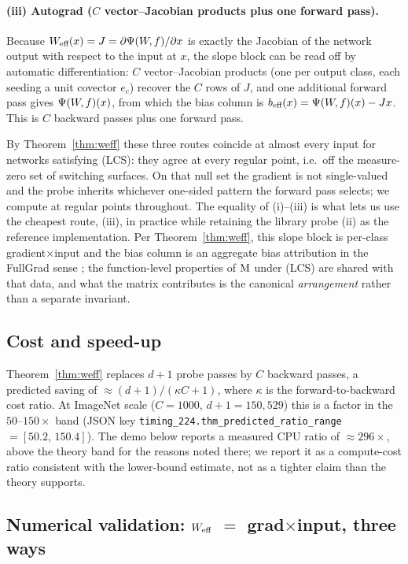 \paragraph{(iii) Autograd ($C$ vector--Jacobian products plus one forward pass).}
Because $W_{\text{eff}}(x)=J=\partial\Psi(W\!,f)/\partial x$ is exactly the Jacobian of the
network output with respect to the input at $x$, the slope block can be read off
by automatic differentiation: $C$ vector--Jacobian products (one per output
class, each seeding a unit covector $e_c$) recover the $C$ rows of $J$, and one
additional forward pass gives $\Psi(W\!,f)(x)$, from which the bias column is
$b_{\text{eff}}(x)=\Psi(W\!,f)(x)-Jx$. This is $C$ backward passes plus one forward pass.

By Theorem~\ref{thm:weff} these three routes coincide at almost every input for
networks satisfying (LCS): they agree at every regular point, i.e.\ off the measure-zero set
of switching surfaces. On that null set the gradient is not single-valued and
the probe inherits whichever one-sided pattern the forward pass selects; we
compute at regular points throughout. The equality of (i)--(iii) is what lets us
use the cheapest route, (iii), in practice while retaining the library probe
(ii) as the reference implementation. Per Theorem~\ref{thm:weff}, this slope
block is per-class gradient$\times$input and the bias column is an aggregate bias
attribution in the FullGrad sense
\citep{shrikumar2016not,ancona2018towards,srinivas2019full}; the function-level
properties of $\mathrm{M}$ under (LCS) are shared with that data, and what the matrix
contributes is the canonical \emph{arrangement} rather than a separate
invariant.

\subsection{Cost and speed-up}
\label{app:eng-cost}

Theorem~\ref{thm:weff} replaces $d{+}1$ probe passes by $C$ backward passes,
a predicted saving of $\approx(d{+}1)/(\kappa C+1)$, where $\kappa$ is the
forward-to-backward cost ratio. At ImageNet scale ($C=1000$,
$d{+}1=150{,}529$) this is a factor in the $50$--$150\times$ band (JSON key
\texttt{timing\_224.thm\_predicted\_ratio\_range} $=[50.2,\,150.4]$). The demo
below reports a measured CPU ratio of $\approx296\times$, above the theory band
for the reasons noted there; we report it as a compute-cost ratio consistent
with the lower-bound estimate, not as a tighter claim than the theory supports.

\subsection{Numerical validation: $W_{\text{eff}}$ $=$ grad$\times$input, three ways}
\label{app:eng-validation}

